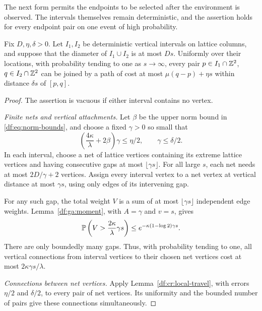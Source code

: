The next form permits the endpoints to be selected after the environment
is observed. The intervals themselves remain deterministic, and the
assertion holds for every endpoint pair on one event of high probability.

\begin{lemma}\label{df:cr:interval-travel}
Fix $D,\eta,\delta>0$. Let $I_1,I_2$ be deterministic vertical intervals
on lattice columns, and suppose that the diameter of $I_1\cup I_2$ is at
most $Ds$. Uniformly over their locations, with probability tending to
one as $s\to\infty$, every pair
$p\in I_1\cap\mathbb Z^2$, $q\in I_2\cap\mathbb Z^2$ can be joined by a path of
cost at most $\mu(q-p)+\eta s$ within distance $\delta s$ of $[p,q]$.
\end{lemma}

\begin{proof}
The assertion is vacuous if either interval contains no vertex.

\emph{Finite nets and vertical attachments.}
Let $\beta$ be the upper norm bound in \eqref{df:eq:norm-bounds}, and
choose a fixed $\gamma>0$ so small that
\[
 \left(\frac{4\kappa}{\lambda}+2\beta\right)\gamma\le\eta/2,
 \qquad \gamma\le\delta/2.
\]
In each interval, choose a net of lattice vertices containing its extreme
lattice vertices and having consecutive gaps at most
$\lfloor\gamma s\rfloor$. For all large $s$, each net needs at most
$2D/\gamma+2$ vertices. Assign every interval vertex to a net vertex at
vertical distance at most $\gamma s$, using only edges of its intervening gap.

For any such gap, the total weight $V$ is a sum of at most
$\lfloor\gamma s\rfloor$ independent edge weights.
Lemma~\ref{df:ga:moment}, with $A=\gamma$ and $v=s$, gives
\[
 \mathbb P\left(V>\frac{2\kappa}{\lambda}\gamma s\right)
 \le e^{-\kappa(1-\log2)\gamma s}.
\]
There are only boundedly many gaps. Thus, with probability tending to
one, all vertical connections from interval vertices to their chosen
net vertices cost at most $2\kappa\gamma s/\lambda$.

\emph{Connections between net vertices.}
Apply Lemma~\ref{df:cr:local-travel}, with errors $\eta/2$ and $\delta/2$,
to every pair of net vertices. Its uniformity and the bounded number
of pairs give these connections simultaneously.


\end{proof}
